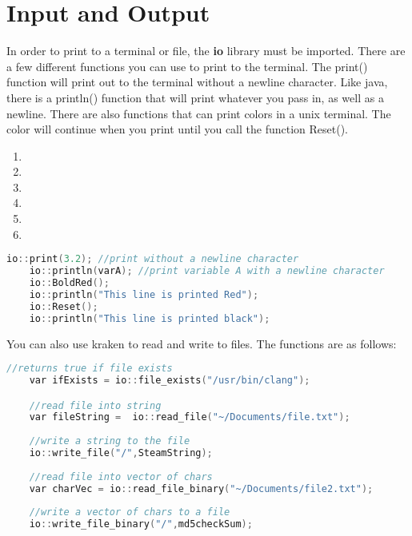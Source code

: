 \documentclass{article}
\begin{document}
\section{Input and Output}
    In order to print to a terminal or file, the {\bf{io}} library must be
  imported.  There are a few different functions you can use to print to the
  terminal. 
    The print() function will print out to the terminal without a newline
  character.  Like java, there is a println() function that will print whatever
  you pass in, as well as a newline.  There are also functions that can print
  colors in a unix terminal.  The color will continue when you print until
  you call the function Reset().
  \begin{enumerate}
    \item {\color{red}{BoldRed()}}
    \item {\color{green}{BoldGreen()}}
    \item {\color{yellow}{BoldYellow()}}
    \item {\color{blue}{BoldBlue()}}
    \item {\color{magenta}{BoldMagneta()}}
    \item {\color{cyan}{BoldCyan()}}
  \end{enumerate}

  \begin{lstlisting}[language=C++]
    io::print(3.2); //print without a newline character
    io::println(varA); //print variable A with a newline character
    io::BoldRed();
    io::println("This line is printed Red");
    io::Reset();
    io::println("This line is printed black");
  \end{lstlisting}
  
    You can also use kraken to read and write to files.  The functions are as
  follows:
  \begin{lstlisting}[language=C++]
    //returns true if file exists
    var ifExists = io::file_exists("/usr/bin/clang"); 

    //read file into string
    var fileString =  io::read_file("~/Documents/file.txt");     
    
    //write a string to the file
    io::write_file("/",SteamString);     
    
    //read file into vector of chars
    var charVec = io::read_file_binary("~/Documents/file2.txt");     
    
    //write a vector of chars to a file
    io::write_file_binary("/",md5checkSum);   
  \end{lstlisting}
\end{document}
